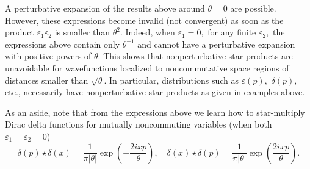 \documentclass[a4paper,12pt]{article}
\begin{document}
A perturbative expansion of the results above around $\theta =0$ are
possible. However, these expressions become invalid (not convergent) as soon
as the product $\varepsilon _{1}\varepsilon _{2}$ is smaller than $\theta
^{2}$. Indeed, when $\varepsilon _{1}=0,$ for any finite $\varepsilon _{2},$
the expressions above contain only $\theta ^{-1}$ and cannot have a
perturbative expansion with positive powers of $\theta .$ This shows that
nonperturbative star products are unavoidable for wavefunctions localized to
noncommutative space regions of distances smaller than $\sqrt{\theta }$. In
particular, distributions such as $\varepsilon \left( p\right) ,$ $\delta
\left( p\right) ,$ etc., necessarily have nonperturbative star products as
given in examples above.

As an aside, note that from the expressions above we learn how to
star-multiply Dirac delta functions for mutually noncommuting variables
(when both $\varepsilon _{1}=\varepsilon _{2}=0$)
\begin{equation}
\delta \left( p\right) \star \delta \left( x\right) =\frac{1}{\pi \left|
\theta \right| }\exp \left( -\frac{2ixp}{\theta }\right) ,\quad \delta
\left( x\right) \star \delta \left( p\right) =\frac{1}{\pi \left| \theta
\right| }\exp \left( \frac{2ixp}{\theta }\right) .
\end{equation}
\end{document}
